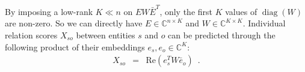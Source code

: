 \documentclass{article}
\newcommand{\diag}{\mathop{\textrm{diag}}}
\newcommand{\transp}{^{T}}
\newcommand{\complexSpace}{\mathbb{C}}
\newcommand{\C}{\complexSpace} %
\newcommand{\real}{\mathrm{Re}}
\newcommand{\imag}{\mathrm{Im}}
\newcommand{\Relation}{\mathbf{X}}
\newcommand{\eemb}{e} %
\begin{document}


By imposing a low-rank $K \ll n$ on $E W \bar{E}^T$, only the first $K$ values of
$\diag(W)$ are non-zero. So we can directly have $E \in \C^{n\times K}$ and
$W \in \C^{K\times K}$. Individual relation scores $X_{so}$ between entities $s$ and $o$ can be predicted through the following product of their embeddings $e_s, e_o\in\C^K$:
\begin{eqnarray}
    X_{so} &=& \real(e_s\transp W \bar{e}_o)\enspace.
    \label{eq:one_rel_model}
\end{eqnarray}





\end{document}
